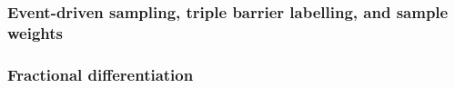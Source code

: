 \documentclass[12pt,a4paper,oneside]{article}
\begin{document}
%


\subsubsection{Event-driven sampling, triple barrier labelling, and sample weights}\label{subsubsec:afml_cusum_tbl_weights}

%
%
%
%
%
%
%


\subsubsection{Fractional differentiation}\label{subsubsec:afml_ffd}

%
\end{document}
